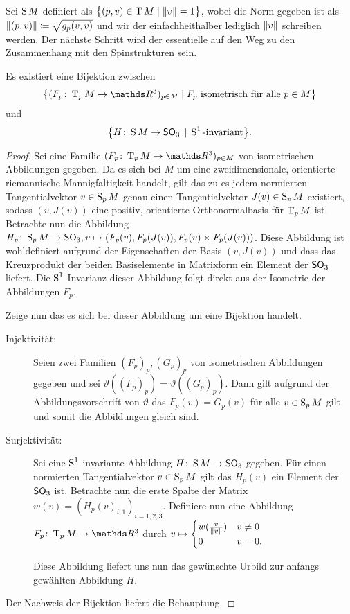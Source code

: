 Sei $\S M$ definiert als $\set{(p,v) \in \T M}{ \norm{v} = 1}$, 
wobei die Norm gegeben ist als $ \norm{(p,v)} \coloneqq \sqrt{g_p(v,v)} $ und wir der einfachheithalber lediglich $ \norm{v} $ schreiben werden.
Der nächste Schritt wird der essentielle auf den Weg zu den Zusammenhang mit den Spinstrukturen sein.

\begin{Satz}
	Es existiert eine Bijektion zwischen 
	\begin{gather*}
		\set{ (\abb{F_p}{\T_pM}{\R^3})_{p\in M} }{ F_p \text{ isometrisch für alle }p \in M}
	\end{gather*}
	und 
	\begin{gather*}
		\set{ \abb{H}{\S M}{\so{3}}}{\S^1 \text{-invariant}}.
	\end{gather*}
\begin{proof}
	Sei eine Familie $(\abb{F_p}{\T_pM}{\R^3})_{p\in M}$ von 
	isometrischen Abbildungen gegeben.
	Da es sich bei $M$ um eine zweidimensionale, orientierte riemannische Mannigfaltigkeit handelt, gilt das zu es jedem normierten Tangentialvektor $v \in \S_p M$ genau einen Tangentialvektor $J(v) \in \S_p M$
	existiert, sodass $(v,J(v))$ eine positiv, orientierte Orthonormalbasis für	$\tang{p}{M}$ ist. Betrachte nun die Abbildung $\abb{H_p}{\S_p%
		M}{\so{3}}, v \mapsto (F_p(v),F_p(J(v)),F_p(v)\times F_p(J(v)))$. 
	Diese Abbildung ist wohldefiniert aufgrund der Eigenschaften
	der Basis $(v,J(v))$ und dass das Kreuzprodukt der beiden
	Basiselemente in Matrixform ein Element der $\so{3}$ liefert.
	Die $\S^1$ Invarianz dieser Abbildung folgt direkt
	aus der Isometrie der Abbildungen $F_p$.
	
	Zeige nun das es sich bei dieser Abbildung um eine Bijektion handelt. 
	\begin{description}
		\item[Injektivität:] Seien zwei Familien $(F_p)_p,(G_p)_p$ von
		isometrischen Abbildungen gegeben und sei $\vartheta((F_p)_p)=\vartheta((G_p)_p)$. Dann gilt aufgrund
		der Abbildungsvorschrift von $\vartheta$ das $F_p(v)=G_p(v)$
		für alle $v \in \S_p M$ gilt und somit die Abbildungen gleich
		sind.
		\item[Surjektivität:] Sei eine $\S^1$-invariante Abbildung
		$\abb{H}{\S M}{\so{3}}$ gegeben. Für einen normierten
		Tangentialvektor $v \in \S_p M$ gilt das $H_p(v)$ ein
		Element der $\so{3}$ ist. Betrachte nun die erste Spalte
		der Matrix $w(v)=(H_p(v)_{i,1})_{i=1,2,3}$. Definiere nun eine
		Abbildung $\abb{F_p}{\tang{p}{M}}{\R^3}$ durch 
		$v \mapsto \begin{cases}
		w(\frac{v}{\norm{v}}) & v \neq 0 \\
		0 & v=0.
		\end{cases}$
		
		Diese Abbildung liefert uns nun das gewünschte Urbild zur
		anfangs gewählten Abbildung $H$. 
	\end{description}
	Der Nachweis der Bijektion liefert die Behauptung.
\end{proof}

\end{Satz}

